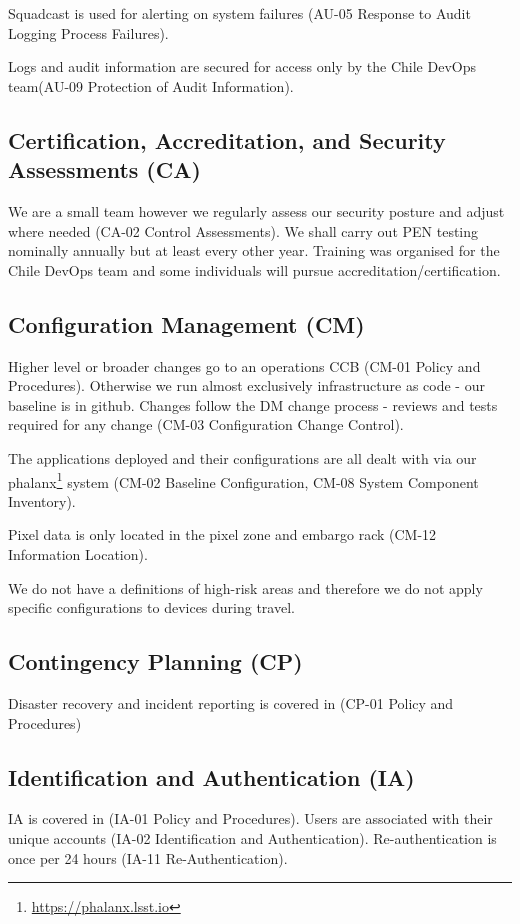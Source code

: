 Squadcast is used for alerting on system failures (AU-05  Response to Audit Logging Process Failures).

Logs and audit information are secured for access only by the Chile DevOps team(AU-09  Protection of Audit Information).


\subsection{Certification, Accreditation, and Security Assessments (CA)} \label{sec:CA}
We are a small team however we regularly assess our security posture and adjust where needed (CA-02  Control Assessments).
We shall carry out PEN testing nominally annually but at least every other year.
Training was organised for the Chile DevOps team and some individuals will pursue accreditation/certification.

\subsection{Configuration Management (CM)} \label{sec:CM}

Higher level or broader changes go to an operations CCB  (CM-01  Policy and Procedures).
Otherwise we run almost exclusively infrastructure as code - our baseline is in github.
Changes follow the DM change process - reviews and tests required for any change (CM-03  Configuration Change Control).


The applications deployed and their configurations are all dealt with via our phalanx\footnote{\url{https://phalanx.lsst.io}} system (CM-02  Baseline Configuration, CM-08  System Component Inventory).

Pixel data is only located in the pixel zone and embargo rack (CM-12  Information Location).


We do not have a definitions of high-risk areas and therefore we do not apply specific configurations to devices during travel.

\subsection{Contingency Planning (CP)} \label{sec:CP}
Disaster recovery and incident reporting is covered in  (CP-01  Policy and Procedures)

\subsection{Identification and Authentication (IA)} \label{sec:IA}
IA is covered in  (IA-01  Policy and Procedures).
Users are associated with their unique  accounts (IA-02  Identification and Authentication).
Re-authentication is once per 24 hours (IA-11  Re-Authentication).


